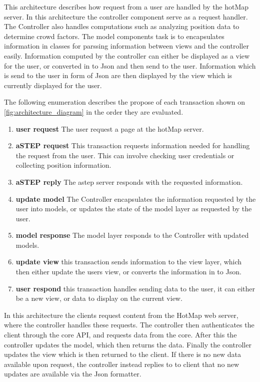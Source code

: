 
This architecture describes how request from a user are handled by the hotMap server.
In this architecture the controller component serve as a request handler. The Controller also handles computations such as analyzing position data to determine crowd factors. 
The model components task is to encapsulates information in classes for parssing information between views and the controller easily. Information computed by the controller can either be displayed as a view for the user, or converted in to Json and then send to the user. Information which is send to the user in form of Json are then displayed by the view which is currently displayed for the user.


The following enumeration describes the propose of each transaction shown on \cref{fig:architecture_diagram} in the order they are evaluated.

\begin{enumerate}
    \item \textbf{user request} The user request a page at the hotMap server.
    \item \textbf{aSTEP request} This transaction requests information needed for handling the request from the user. This can involve checking user credentials or collecting position information.
    \item \textbf{aSTEP reply} The astep server responds with the requested information.
    \item \textbf{update model} The Controller encapsulates the information requested by the user into models, or updates the state of the model layer as requested by the user.
    \item \textbf{model response} The model layer responds to the Controller with updated models.
    \item \textbf{update view} this transaction sends information to the view layer, which then either update the users view, or converts the information in to Json. 
     \item \textbf{user respond} this transaction handles sending data to the user, it can either be a new view, or data to display on the current view.
\end{enumerate}


In this architecture the clients request content from the HotMap web server, where the controller handles these requests. The controller then authenticates the client through the core API, and requests data from the core. After this the controller updates the model, which then returns the data. Finally the controller updates the view which is then returned to the client. If there is no new data available upon request, the controller instead replies to to client that no new updates are available via the Json formatter.

